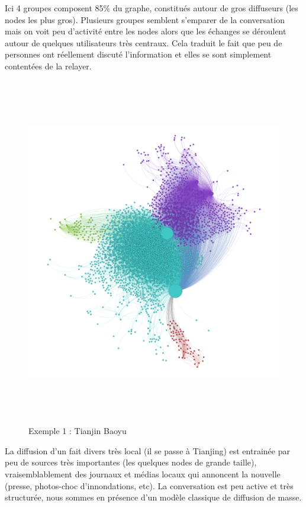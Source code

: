 Ici 4 groupes composent 85\% du graphe, constitués autour de gros diffuseurs (les nodes les plus gros). Plusieurs groupes semblent s{\textquoteright}emparer de la conversation mais on voit peu d{\textquoteright}activité entre les nodes alors que les échanges se déroulent autour de quelques utilisateurs très centraux. Cela traduit le fait que peu de personnes ont réellement discuté l{\textquoteright}information et elles se sont simplement contentées de la relayer.

\begin{figure}[th]
    \centering
    \includegraphics[width=6.0114in,height=6.0114in]{figures/chap3/chapitre3-img17.png}
    \caption{Exemple 1 : Tianjin Baoyu}
\end{figure}

La diffusion d{\textquoteright}un fait divers très local (il se passe à Tianjing) est entrainée par peu de sources très importantes (les quelques nodes de grande taille), vraisemblablement des journaux et médias locaux qui annoncent la nouvelle (presse, photos-choc d{\textquoteright}innondations, etc). La conversation est peu active et très structurée, nous sommes en présence d{\textquoteright}un modèle classique de diffusion de masse.

